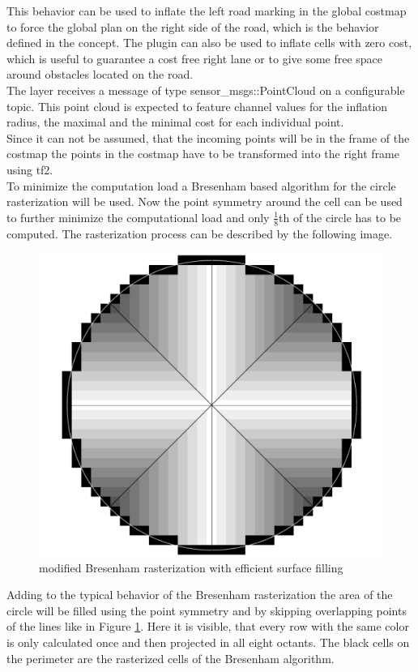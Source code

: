 This behavior can be used to inflate the left road marking in the global costmap to force the global plan on the right side of the road, which is the behavior defined in the concept. The plugin can also be used to inflate cells with zero cost, which is useful to guarantee a cost free right lane or to give some free space around obstacles located on the road.\\

The layer receives a message of type sensor\_msgs::PointCloud on a configurable topic. This point cloud is expected to feature channel values for the inflation radius, the maximal and the minimal cost for each individual point.\\

Since it can not be assumed, that the incoming points will be in the frame of the costmap the points in the costmap have to be transformed into the right frame using tf2.\\

To minimize the computation load a Bresenham based algorithm for the circle rasterization will be used\cite{ComputerGraphics}. Now the point symmetry around the cell can be used to further minimize the computational load and only $\frac{1}{8}$th of the circle has to be computed. The rasterization process can be described by the following image.\\

\begin{figure}
	\centering
	\includegraphics[width=.5\textwidth]{Pictures/rasterization}
	\caption{modified Bresenham rasterization with efficient surface filling}
	\label{rasterization}
\end{figure}


Adding to the typical behavior of the Bresenham rasterization the area of the circle will be filled using the point symmetry and by skipping overlapping points of the lines like in Figure \ref{rasterization}. Here it is visible, that every row with the same color is only calculated once and then projected in all eight octants. The black cells on the perimeter are the rasterized cells of the Bresenham algorithm.

